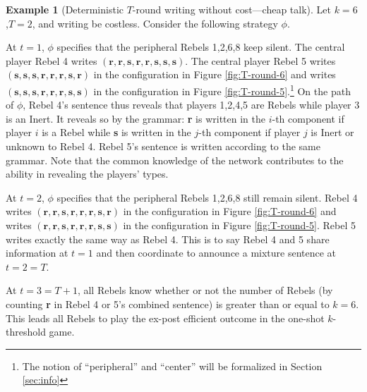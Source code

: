\documentclass[12pt,letter]{article}
\theoremstyle{definition}
\newtheorem{example}{Example}
\theoremstyle{remark}
\theoremstyle{claim}
\begin{document}
%
\begin{example}[Deterministic $T$-round writing without cost---cheap talk]
\label{ex:cheap_talk}
Let $k=6$ ,$T=2$, and writing be costless. Consider the following strategy $\phi$. 

At $t=1$, $\phi$ specifies that the peripheral Rebels 1,2,6,8 keep silent. The central player Rebel 4 writes $(\textbf{r},\textbf{r},\textbf{s},\textbf{r},\textbf{r},\textbf{s},\textbf{s},\textbf{s})$. The central player Rebel 5 writes $(\textbf{s},\textbf{s},\textbf{s},\textbf{r},\textbf{r},\textbf{r},\textbf{s},\textbf{r})$ in the configuration in Figure \ref{fig:T-round-6} and writes $(\textbf{s},\textbf{s},\textbf{s},\textbf{r},\textbf{r},\textbf{r},\textbf{s},\textbf{s})$ in the configuration in Figure \ref{fig:T-round-5}.\footnote{The notion of ``peripheral'' and ``center'' will be formalized in Section \ref{sec:info}} On the path of $\phi$, Rebel 4's sentence thus reveals that players 1,2,4,5 are Rebels while player 3 is an Inert. It reveals so by the grammar: \textbf{r} is written in the $i$-th component if player $i$ is a Rebel while  \textbf{s} is written in the $j$-th component if player $j$ is Inert or unknown to Rebel 4. Rebel 5's sentence is written according to the same grammar. Note that the common knowledge of the network contributes to the ability in revealing the players' types. 

At $t=2$, $\phi$ specifies that the peripheral Rebels 1,2,6,8 still remain silent. Rebel 4 writes $(\textbf{r},\textbf{r},\textbf{s},\textbf{r},\textbf{r},\textbf{r},\textbf{s},\textbf{r})$ in the configuration in Figure \ref{fig:T-round-6} and writes $(\textbf{r},\textbf{r},\textbf{s},\textbf{r},\textbf{r},\textbf{r},\textbf{s},\textbf{s})$ in the configuration in Figure \ref{fig:T-round-5}. Rebel 5 writes exactly the same way as Rebel 4. This is to say Rebel 4 and 5 share information at $t=1$ and then coordinate to announce a mixture sentence at $t=2=T$. 

At $t=3=T+1$, all Rebels know whether or not the number of Rebels (by counting \textbf{r} in Rebel 4 or 5's combined sentence) is greater than or equal to $k=6$. This leads all Rebels to play the ex-post efficient outcome in the one-shot $k$-threshold game. 



\end{example}
\end{document}
